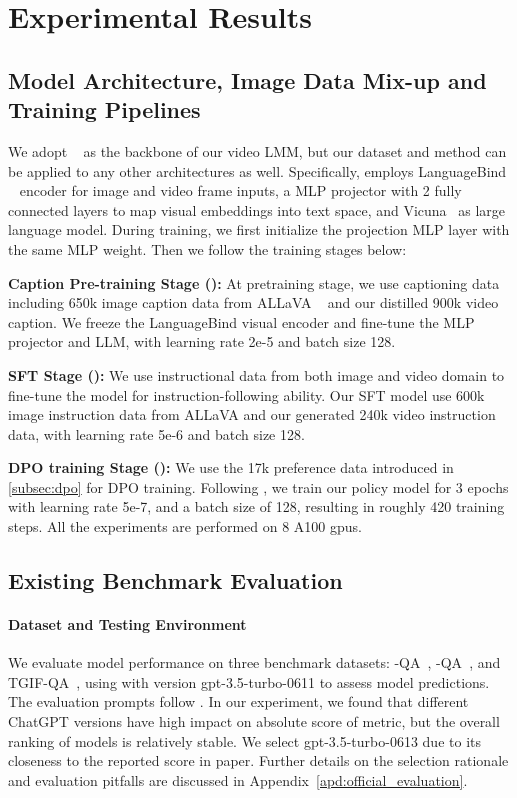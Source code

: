 \section{Experimental Results}
\subsection{Model Architecture, Image Data Mix-up and  Training Pipelines }
We adopt \videollava ~\citep{lin2023videollava} as the backbone of our video LMM, but our dataset and method can be applied to any other architectures as well. Specifically, \videollava employs LanguageBind ~\citep{zhu2023languagebind} encoder for image and video frame inputs, a MLP projector with 2 fully connected layers to map visual embeddings into text space, and Vicuna~\cite{chiang2023vicuna} as large language model. During training, we first initialize the projection MLP layer with the 
same \videollava MLP weight. Then we follow the training stages below:

\noindent \textbf{Caption Pre-training Stage (\modelpt):}
At pretraining stage, we use captioning data including 650k image caption data from ALLaVA ~\citep{chen2024allava} and our distilled 900k video caption. We freeze the LanguageBind visual encoder and fine-tune the MLP projector and LLM, with learning rate 2e-5 and batch size 128.

\noindent \textbf{SFT Stage (\modelsft):}
We use instructional data from both image and video domain to fine-tune the model for instruction-following ability. Our SFT model use
 600k image instruction data from ALLaVA and our generated 240k video instruction data, with learning rate 5e-6 and batch size 128.

\noindent \textbf{DPO training Stage (\modelname):}
We use the 17k preference data introduced in \cref{subsec:dpo} for DPO training. Following \cite{ivison2023camels}, we train our policy model for $3$ epochs with learning rate 5e-7, and a batch size of 128, resulting in roughly 420 training steps. All the experiments are performed on 8 A100 gpus.

\subsection{Existing Benchmark Evaluation}
\paragraph{Dataset and Testing Environment}
We evaluate model performance on three benchmark datasets: \msvd-QA~\cite{chen2011collecting}, \msrvtt-QA~\cite{xu2016msr}, and TGIF-QA~\cite{jang2017tgif}, using \chatgpt with version gpt-3.5-turbo-0611 to assess model predictions. The evaluation prompts follow  \cite{maaz2023video}. In our experiment, we found that different ChatGPT versions have high impact on absolute score of metric, but the overall ranking of models is relatively stable. We select gpt-3.5-turbo-0613 due to its closeness to the reported score in \videollava paper. Further details on the selection rationale and evaluation pitfalls are discussed in Appendix~\ref{apd:official_evaluation}.

